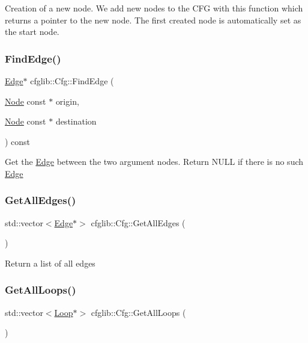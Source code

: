 Creation of a new node. We add new nodes to the C\+FG with this function which returns a pointer to the new node. The first created node is automatically set as the start node. \mbox{\label{classcfglib_1_1Cfg_a89f9917fc598d5782698823d2d006782}} 
\subsubsection{\texorpdfstring{Find\+Edge()}{FindEdge()}}
{\footnotesize\ttfamily \hyperlink{classcfglib_1_1Edge}{Edge}$\ast$ cfglib\+::\+Cfg\+::\+Find\+Edge (\begin{DoxyParamCaption}\item[{\hyperlink{classcfglib_1_1Node}{Node} const $\ast$}]{origin,  }\item[{\hyperlink{classcfglib_1_1Node}{Node} const $\ast$}]{destination }\end{DoxyParamCaption}) const}

Get the \hyperlink{classcfglib_1_1Edge}{Edge} between the two argument nodes. Return N\+U\+LL if there is no such \hyperlink{classcfglib_1_1Edge}{Edge} \mbox{\label{classcfglib_1_1Cfg_aae35959d564c688ffe76f3d121c47447}} 
\subsubsection{\texorpdfstring{Get\+All\+Edges()}{GetAllEdges()}}
{\footnotesize\ttfamily std\+::vector$<$\hyperlink{classcfglib_1_1Edge}{Edge}$\ast$$>$ cfglib\+::\+Cfg\+::\+Get\+All\+Edges (\begin{DoxyParamCaption}{ }\end{DoxyParamCaption})}

Return a list of all edges \mbox{\label{classcfglib_1_1Cfg_ac5e6efa01325b49924190a1f89727ed5}} 
\subsubsection{\texorpdfstring{Get\+All\+Loops()}{GetAllLoops()}}
{\footnotesize\ttfamily std\+::vector$<$\hyperlink{classcfglib_1_1Loop}{Loop}$\ast$$>$ cfglib\+::\+Cfg\+::\+Get\+All\+Loops (\begin{DoxyParamCaption}{ }\end{DoxyParamCaption})}

